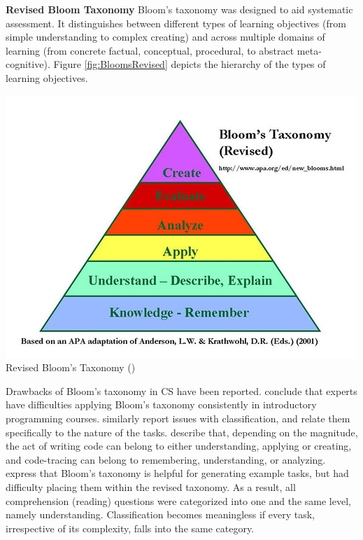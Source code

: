 \noindent \textbf{Revised Bloom Taxonomy}\newline
Bloom's taxonomy was designed to aid systematic assessment. It distinguishes between different types of learning objectives (from simple understanding to complex creating) and across multiple domains of learning (from concrete factual, conceptual, procedural, to abstract meta-cognitive). Figure \ref{fig:BloomsRevised} depicts the hierarchy of the types of learning objectives.


\includegraphics[scale=0.6]{figures/bloomsrevised.jpg}
Revised Bloom's Taxonomy (\cite{krathwohl2002revision})


Drawbacks of Bloom's taxonomy in CS have been reported.  conclude that experts have difficulties applying Bloom's taxonomy consistently in introductory programming courses.  similarly report issues with classification, and relate them specifically to the nature of the tasks.  describe that, depending on the magnitude, the act of writing code can belong to either understanding, applying or creating, and code-tracing can belong to remembering, understanding, or  analyzing.  express that Bloom's taxonomy is helpful for generating example tasks, but had difficulty placing them within the revised taxonomy. As a result, all comprehension (reading) questions were categorized into one and the same level, namely understanding. Classification becomes meaningless if every task, irrespective of its complexity, falls into the same category.


